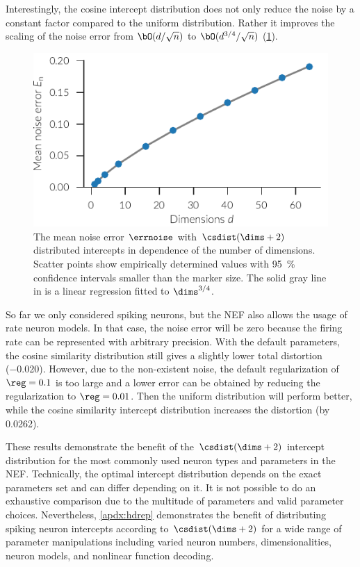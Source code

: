 Interestingly, the cosine intercept distribution does not only reduce the noise by a constant factor compared to the uniform distribution.
Rather it improves the scaling of the noise error from $\bO(d/\sqrt{n})$ to $\bO(d^{3/4}/\sqrt{n})$ (\cref{fig:cs-error-scaling}).
\begin{figure}
    \centering
    \includegraphics{figures/cs-error-scaling}
    \caption[Mean noise error with uniform intercepts]{The mean noise error $\errnoise$ with $\csdist(\dims + 2)$ distributed intercepts in dependence of the number of dimensions. Scatter points show empirically determined values with \SI{95}{\percent} confidence intervals smaller than the marker size. The solid gray line in is a linear regression fitted to $\dims^{3/4}$.}\label{fig:cs-error-scaling}
\end{figure}

So far we only considered spiking neurons, but the NEF also allows the usage of rate neuron models.
In that case, the noise error will be zero because the firing rate can be represented with arbitrary precision.
With the default parameters, the cosine similarity distribution still gives a slightly lower total distortion (\num{-0.020}).
However, due to the non-existent noise, the default regularization of $\reg = 0.1$ is too large and a lower error can be obtained by reducing the regularization to $\reg = 0.01$.
Then the uniform distribution will perform better, while the cosine similarity intercept distribution increases the distortion (by \num{+0.0262}).

These results demonstrate the benefit of the $\csdist(\dims + 2)$ intercept distribution for the most commonly used neuron types and parameters in the NEF\@.
Technically, the optimal intercept distribution depends on the exact parameters set and can differ depending on it.
It is not possible to do an exhaustive comparison due to the multitude of parameters and valid parameter choices.
Nevertheless, \cref{apdx:hdrep} demonstrates the benefit of distributing spiking neuron intercepts according to $\csdist(\dims + 2)$ for a wide range of parameter manipulations including varied neuron numbers, dimensionalities, neuron models, and nonlinear function decoding.

